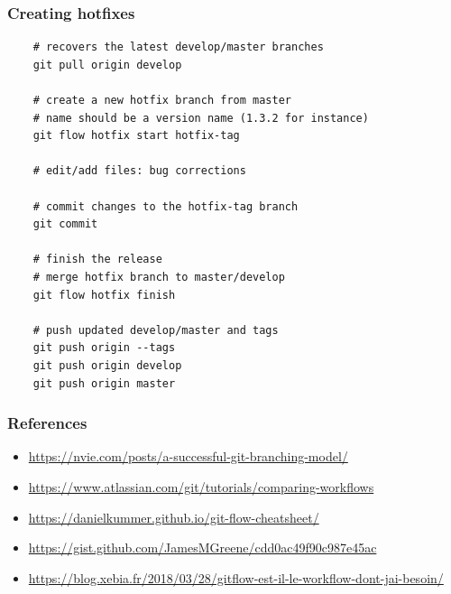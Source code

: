 \documentclass[svgnames]{beamer}
\begin{document}
\begin{frame}[fragile]
    \frametitle{Creating hotfixes}
    \begin{lstlisting}
    # recovers the latest develop/master branches
    git pull origin develop

    # create a new hotfix branch from master
    # name should be a version name (1.3.2 for instance)
    git flow hotfix start hotfix-tag

    # edit/add files: bug corrections

    # commit changes to the hotfix-tag branch
    git commit 

    # finish the release
    # merge hotfix branch to master/develop
    git flow hotfix finish

    # push updated develop/master and tags
    git push origin --tags
    git push origin develop
    git push origin master
    \end{lstlisting}
\end{frame}

\begin{frame}
    \frametitle{References} %

    \begin{itemize}
        \item \url{https://nvie.com/posts/a-successful-git-branching-model/}
        \item \url{https://www.atlassian.com/git/tutorials/comparing-workflows}
        \item \url{https://danielkummer.github.io/git-flow-cheatsheet/}
        \item \url{https://gist.github.com/JamesMGreene/cdd0ac49f90c987e45ac}
        \item \url{https://blog.xebia.fr/2018/03/28/gitflow-est-il-le-workflow-dont-jai-besoin/}
    \end{itemize}

\end{frame}
\end{document}
